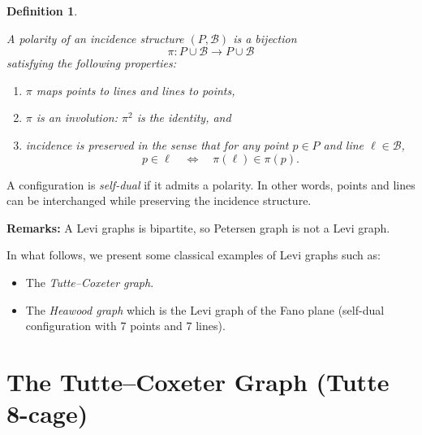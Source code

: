 \documentclass[12pt,a4paper,openany]{book}
\newtheorem{definition}{Definition}[section]
\begin{document}
\begin{definition}
\begin{enumerate}

A \emph{polarity} of an incidence structure $(P, \mathcal{B})$ is a bijection 
\[
\pi: P \cup \mathcal{B} \to P \cup \mathcal{B}
\] 
satisfying the following properties:
\begin{enumerate}
    \item $\pi$ maps points to lines and lines to points,
    \item $\pi$ is an involution: $\pi^2$ is the identity, and
    \item incidence is preserved in the sense that for any point $p \in P$ and line $\ell \in \mathcal{B}$, 
    \[
    p \in \ell \quad \Longleftrightarrow \quad \pi(\ell) \in \pi(p).
    \]
\end{enumerate}
\end{enumerate}
\end{definition}
\bigskip


\noindent A configuration is \emph{self-dual} if it admits a polarity. In other words, points and lines can be interchanged while preserving the incidence structure.
\bigskip

\noindent\textbf{Remarks:} A Levi graphs is  bipartite, so Petersen graph is not a Levi graph.
\bigskip

In what follows, we present some classical examples of Levi graphs such as:

\begin{itemize}
\item The \emph{Tutte–Coxeter graph}.
    \item The \emph{Heawood graph} which is the  Levi graph of the Fano plane (self-dual configuration with 7 points and 7 lines). 
    
\end{itemize}




\section{The Tutte--Coxeter Graph (Tutte 8-cage)}
\end{document}
